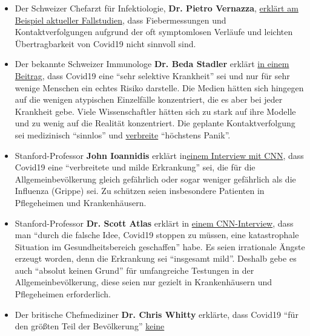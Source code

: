 \begin{itemize}
{  Druck zu setzen}. Das Originalvideo wurde vom Arzt inzwischen
  entfernt.
\item
  Der Schweizer Chefarzt für Infektiologie, \textbf{Dr. Pietro
  Vernazza},
  \href{https://infekt.ch/2020/05/expedition-mit-ueberraschendem-ausgang-ein-epidemiologisches-lehrstueck/}{erklärt
  am Beispiel aktueller Fallstudien}, dass Fiebermessungen und
  Kontaktverfolgungen aufgrund der oft symptomlosen Verläufe und
  leichten Übertragbarkeit von Covid19 nicht sinnvoll sind.
\item
  Der bekannte Schweizer Immunologe \textbf{Dr. Beda Stadler} erklärt
  \href{https://www.swissinfo.ch/ita/seconda-ondata-con-lockdown--in-svizzera-no-di-sicuro/45797198}{in
  einem Beitrag}, dass Covid19 eine ``sehr selektive Krankheit'' sei und
  nur für sehr wenige Menschen ein echtes Risiko darstelle. Die Medien
  hätten sich hingegen auf die wenigen atypischen Einzelfälle
  konzentriert, die es aber bei jeder Krankheit gebe. Viele
  Wissenschaftler hätten sich zu stark auf ihre Modelle und zu wenig auf
  die Realität konzentriert. Die geplante Kontaktverfolgung sei
  medizinisch ``sinnlos'' und
  \href{https://www.blick.ch/news/schweiz/behoerden-und-experten-raetseln-wo-ist-das-virus-hin-id15915001.html}{verbreite}
  ``höchstens Panik''.
\item
  Stanford-Professor \textbf{John Ioannidis} erklärt
  in\href{https://twitter.com/cnn/status/1256579248342564865}{einem
  Interview mit CNN}, dass Covid19 eine ``verbreitete und milde
  Erkrankung'' sei, die für die Allgemeinbevölkerung gleich gefährlich
  oder sogar weniger gefährlich als die Influenza (Grippe) sei. Zu
  schützen seien insbesondere Patienten in Pflegeheimen und
  Krankenhäusern.
\item
  Stanford-Professor \textbf{Dr. Scott Atlas} erklärt in
  \href{https://www.facebook.com/cnn/posts/10160799274796509}{einem
  CNN-Interview}, dass man ``durch die falsche Idee, Covid19 stoppen zu
  müssen, eine katastrophale Situation im Gesundheitsbereich
  geschaffen'' habe. Es seien irrationale Ängste erzeugt worden, denn
  die Erkrankung sei ``insge­samt mild''. Deshalb gebe es auch ``absolut
  keinen Grund'' für umfangreiche Testungen in der Allgemeinbevölkerung,
  diese seien nur gezielt in Krankenhäusern und Pflegeheimen
  erforderlich.
\item
  Der britische Chefmediziner \textbf{Dr. Chris Whitty} erklärte, dass
  Covid19 ``für den größten Teil der Bevölkerung''
  \href{https://off-guardian.org/2020/05/15/watch-uk-chief-medic-confirms-again-covid19-harmless-to-vast-majority/}{keine
}
\end{itemize}

